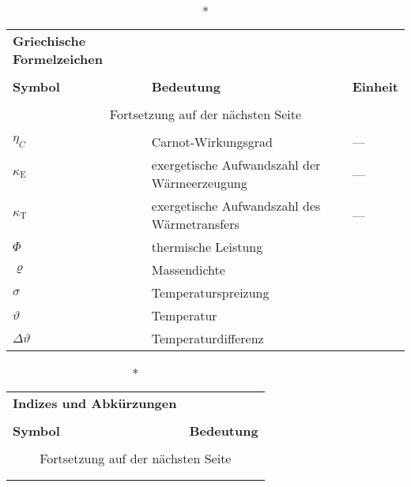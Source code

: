 \begin{onehalfspacing}
\begin{longtable}[h]{p{} p{} p{}}
		
\end{longtable}

\begin{longtable}[h]{p{} p{} p{}}
		\caption*{\textbf{Griechische Formelzeichen}} \\
		\\
		\textbf{Symbol} & \textbf{Bedeutung} & \textbf{Einheit} \\ %
		\endhead
		\\
		\multicolumn{3}{c}{Fortsetzung auf der nächsten Seite} \\
		\endfoot
		\multicolumn{3}{c}{ } \\
		\endlastfoot
		
		$\eta_{C}$ & Carnot-Wirkungsgrad & ---\\
		$\kappa_{\mathrm{E}}$ & exergetische Aufwandszahl der Wärmeerzeugung & ---\\
		$\kappa_{\mathrm{T}}$ & exergetische Aufwandszahl des Wärmetransfers & ---\\
		$\Phi$ & thermische Leistung & \watt\\
		$\varrho$& Massendichte&\kilogrampercubicmetre\\
			$\sigma$&Temperaturspreizung&\kelvin\\
		$\vartheta $ & Temperatur  & \degreecelsius\\
		$\Delta\vartheta $ & Temperaturdifferenz  &\kelvin\\
		
\end{longtable}

\begin{longtable}[h]{p{} p{}}
		\caption*{\textbf{Indizes und Abkürzungen}} \\
		\\
		\textbf{Symbol} & \textbf{Bedeutung} \\ %
		\endhead
		\\
		\multicolumn{2}{c}{Fortsetzung auf der nächsten Seite} \\
		\endfoot
		\multicolumn{2}{c}{ } \\
		\endlastfoot
		

\end{longtable}
\end{onehalfspacing}
